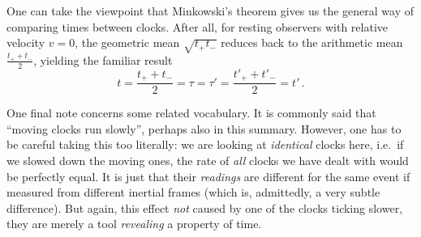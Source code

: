 


One can take the viewpoint that Minkowski's theorem gives us the general way of comparing times between clocks. After all, for resting observers with relative velocity $v = 0$, the geometric mean $\sqrt{t_+ t_-}$ reduces back to the arithmetic mean $\frac{t_+ + t_-}{2}$, yielding the familiar result
\begin{equation}
	t = \frac{t_+ + t_-}{2} = \tau = \tau' = \frac{t'_+ + t'_-}{2} = t' \, .
\end{equation}


One final note concerns some related vocabulary. It is commonly said that \enquote{moving clocks run slowly}, perhaps also in this summary. However, one has to be careful taking this too literally: we are looking at \emph{identical} clocks here, i.e.~if we slowed down the moving ones, the rate of \emph{all} clocks we have dealt with would be perfectly equal. It is just that their \emph{readings} are different for the same event if measured from different inertial frames (which is, admittedly, a very subtle difference). But again, this effect \emph{not} caused by one of the clocks ticking slower, they are merely a tool \emph{revealing} a property of time.








